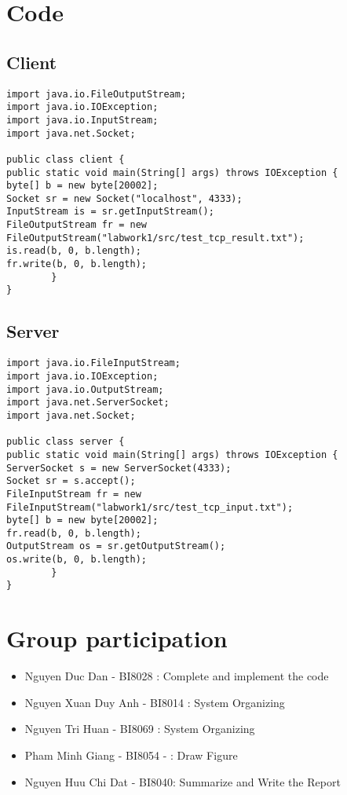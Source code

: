 \documentclass[12pt]{article}
\begin{document}
\pagebreak

\section{Code}
\subsection{Client}
\begin{lstlisting}
import java.io.FileOutputStream;
import java.io.IOException;
import java.io.InputStream;
import java.net.Socket;

public class client {
public static void main(String[] args) throws IOException {
byte[] b = new byte[20002];
Socket sr = new Socket("localhost", 4333);
InputStream is = sr.getInputStream();
FileOutputStream fr = new FileOutputStream("labwork1/src/test_tcp_result.txt");
is.read(b, 0, b.length);
fr.write(b, 0, b.length);
		}
}
\end{lstlisting}

\subsection{Server}
\begin{lstlisting}
import java.io.FileInputStream;
import java.io.IOException;
import java.io.OutputStream;
import java.net.ServerSocket;
import java.net.Socket;

public class server {
public static void main(String[] args) throws IOException {
ServerSocket s = new ServerSocket(4333);
Socket sr = s.accept();
FileInputStream fr = new FileInputStream("labwork1/src/test_tcp_input.txt");
byte[] b = new byte[20002];
fr.read(b, 0, b.length);
OutputStream os = sr.getOutputStream();
os.write(b, 0, b.length);
		}
}
\end{lstlisting}


\section{Group participation}
\begin{itemize}
	\item Nguyen Duc Dan - BI8028 : Complete and implement the code
	\item Nguyen Xuan Duy Anh - BI8014 : System Organizing
	\item Nguyen Tri Huan - BI8069 : System Organizing
	\item Pham Minh Giang - BI8054 - : Draw Figure
	\item Nguyen Huu Chi Dat - BI8040: Summarize and 
	Write the Report
\end{itemize}
\end{document}

